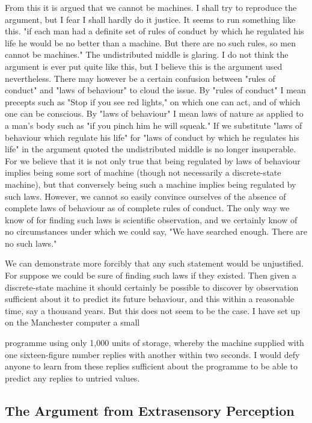 \documentclass{article}
\begin{document}
From this it is argued that we cannot be machines. I shall try to reproduce the argument, but I fear I shall hardly do it justice. It seems to run something like this. "if each man had a definite set of rules of conduct by which he regulated his life he would be no better than a machine. But there are no such rules, so men cannot be machines." The undistributed middle is glaring. I do not think the argument is ever put quite like this, but I believe this is the argument used nevertheless. There may however be a certain confusion between "rules of conduct" and "laws of behaviour" to cloud the issue. By "rules of conduct" I mean precepts such as "Stop if you see red lights," on which one can act, and of which one can be conscious. By "laws of behaviour" I mean laws of nature as applied to a man's body such as "if you pinch him he will squeak." If we substitute "laws of behaviour which regulate his life" for "laws of conduct by which he regulates his life" in the argument quoted the undistributed middle is no longer insuperable. For we believe that it is not only true that being regulated by laws of behaviour implies being some sort of machine (though not necessarily a discrete-state machine), but that conversely being such a machine implies being regulated by such laws. However, we cannot so easily convince ourselves of the absence of complete laws of behaviour as of complete rules of conduct. The only way we know of for finding such laws is scientific observation, and we certainly know of no circumstances under which we could say, "We have searched enough. There are no such laws."

We can demonstrate more forcibly that any such statement would be unjustified. For suppose we could be sure of finding such laws if they existed. Then given a discrete-state machine it should certainly be possible to discover by observation sufficient about it to predict its future behaviour, and this within a reasonable time, say a thousand years. But this does not seem to be the case. I have set up on the Manchester computer a small

programme using only 1,000 units of storage, whereby the machine supplied with one sixteen-figure number replies with another within two seconds. I would defy anyone to learn from these replies sufficient about the programme to be able to predict any replies to untried values.


\subsection{The Argument from Extrasensory Perception}
\end{document}
